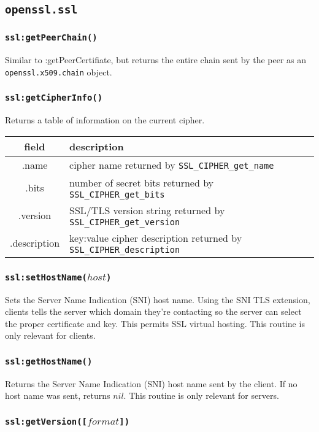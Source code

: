 \documentclass[11pt, oneside]{memoir}
\newcommand*{\fn}[1]{\texttt{#1}\xspace}
\newcommand*{\module}[1]{\texttt{#1}\xspace}
\newcounter{toccols}
\newenvironment{Module}[1]{
	\subsection{\texttt{#1}}
	\addtocontents{toc}{
		\protect\begin{multicols}{\value{toccols}}
	}
}{
	\addtocontents{toc}{\protect\end{multicols}}
}
\begin{document}
\begin{Module}{openssl.ssl}
\subsubsection[\fn{ssl:getPeerChain}]{\fn{ssl:getPeerChain()}}

Similar to :getPeerCertifiate, but returns the entire chain sent by the peer as an \module{openssl.x509.chain} object.

\subsubsection[\fn{ssl:getCipherInfo}]{\fn{ssl:getCipherInfo()}}

Returns a table of information on the current cipher.

\begin{tabular}{ c | l }
field & description\\\hline
.name & cipher name returned by \fn{SSL\_CIPHER\_get\_name}\\
.bits & number of secret bits returned by \fn{SSL\_CIPHER\_get\_bits}\\
.version & SSL/TLS version string returned by \fn{SSL\_CIPHER\_get\_version}\\
.description & key:value cipher description returned by \fn{SSL\_CIPHER\_description}
\end{tabular}

\subsubsection[\fn{ssl:setHostName}]{\fn{ssl:setHostName($host$)}}

Sets the Server Name Indication (SNI) host name. Using the SNI TLS extension, clients tells the server which domain they're contacting so the server can select the proper certificate and key. This permits SSL virtual hosting. This routine is only relevant for clients.

\subsubsection[\fn{ssl:getHostName}]{\fn{ssl:getHostName()}}

Returns the Server Name Indication (SNI) host name sent by the client. If no host name was sent, returns $nil$. This routine is only relevant for servers.

\subsubsection[\fn{ssl:getVersion}]{\fn{ssl:getVersion([$format$])}}


\end{Module}
\end{document}
